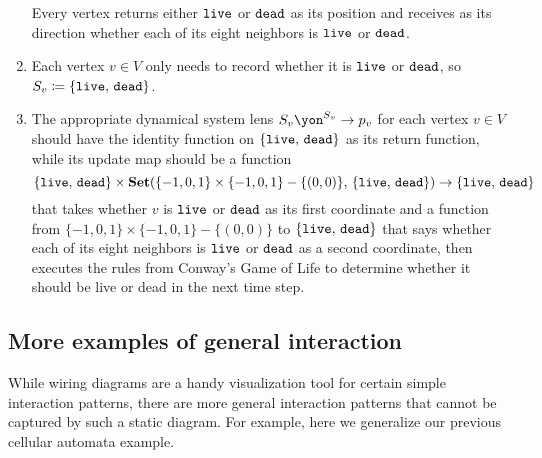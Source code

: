 \documentclass[Book-Poly]{subfiles}
\begin{document}
\begin{exercise}
\begin{solution}
\begin{enumerate}
\[    \]
    Every vertex returns either $\texttt{live}$ or $\texttt{dead}$ as its position and receives as its direction whether each of its eight neighbors is $\texttt{live}$ or $\texttt{dead}$.
    \item Each vertex $v\in V$ only needs to record whether it is $\texttt{live}$ or $\texttt{dead}$, so $S_v\coloneqq\{\texttt{live},\,\texttt{dead}\}$.
    \item The appropriate dynamical system lens $S_v\yon^{S_v}\to p_v$ for each vertex $v\in V$ should have the identity function on $\{\texttt{live},\,\texttt{dead}\}$ as its return function, while its update map should be a function
    \[
        \{\texttt{live},\,\texttt{dead}\}\times\mathbf{Set}(\{-1,0,1\}\times\{-1,0,1\}-\{(0,0)\},\, \{\texttt{live},\,\texttt{dead}\})\to\{\texttt{live},\,\texttt{dead}\}
    \]
    that takes whether $v$ is $\texttt{live}$ or $\texttt{dead}$ as its first coordinate and a function from $\{-1,0,1\}\times\{-1,0,1\}-\{(0,0)\}$ to $\{\texttt{live},\,\texttt{dead}\}$ that says whether each of its eight neighbors is $\texttt{live}$ or $\texttt{dead}$ as a second coordinate, then executes the rules from Conway's Game of Life to determine whether it should be live or dead in the next time step.
\end{enumerate}
\end{solution}
\end{exercise}


\subsection{More examples of general interaction}

While wiring diagrams are a handy visualization tool for certain simple interaction patterns, there are more general interaction patterns that cannot be captured by such a static diagram.
For example, here we generalize our previous cellular automata example.
\end{document}
